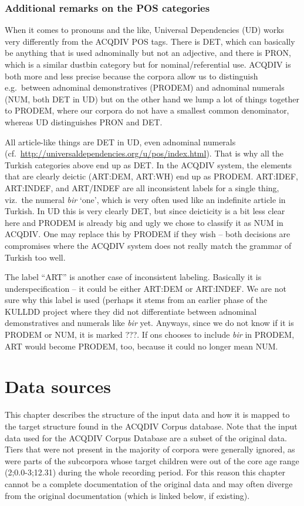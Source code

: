 \documentclass[a4paper, 11pt]{book}
\begin{document}
\subsection{Additional remarks on the POS categories}
\label{sec: Additional remarks on the POS categories}
When it comes to pronouns and the like, Universal Dependencies (UD) works very differently from the ACQDIV POS tags. There is DET, which can basically be anything that is used adnominally but not an adjective, and there is PRON, which is a similar dustbin category but for nominal/referential use. ACQDIV is both more and less precise because the corpora allow us to distinguish e.g.\ between adnominal demonstratives (PRODEM) and adnominal numerals (NUM, both DET in UD) but on the other hand we lump a lot of things together to PRODEM, where our corpora do not have a smallest common denominator, whereas UD distinguishes PRON and DET.

All article-like things are DET in UD, even adnominal numerals (cf.\ \url{http://universaldependencies.org/u/pos/index.html}). That is why all the Turkish categories above end up as DET. In the ACQDIV system, the elements that are clearly deictic (ART:DEM, ART:WH) end up as PRODEM. ART:IDEF, ART:INDEF, and ART/INDEF are all inconsistent labels for a single thing, viz.\ the numeral \textit{bir} `one', which is very often used like an indefinite article in Turkish. In UD this is very clearly DET, but since deicticity is a bit less clear here and PRODEM is already big and ugly we chose to classify it as NUM in ACQDIV. One may replace this by PRODEM if they wish -- both decisions are compromises where the ACQDIV system does not really match the grammar of Turkish too well.

The label ``ART'' is another case of inconsistent labeling. Basically it is underspecification -- it could be either ART:DEM or ART:INDEF. We are not sure why this label is used (perhaps it stems from an earlier phase of the KULLDD project where they did not differentiate between adnominal demonstratives and numerals like \textit{bir} yet. Anyways, since we do not know if it is PRODEM or NUM, it is marked ???. If ons chooses to include \textit{bir} in PRODEM, ART would become PRODEM, too, because it could no longer mean NUM.


\chapter{Data sources}
\label{cha:Data sources}
This chapter describes the structure of the input data and how it is mapped to the target structure found in the ACQDIV Corpus database. Note that the input data used for the ACQDIV Corpus Database are a subset of the original data. Tiers that were not present in the majority of corpora were generally ignored, as were parts of the subcorpora whose target children were out of the core age range (2;0.0-3;12.31) during the whole recording period. For this reason this chapter cannot be a complete documentation of the original data and may often diverge from the original documentation (which is linked below, if existing).
\end{document}
